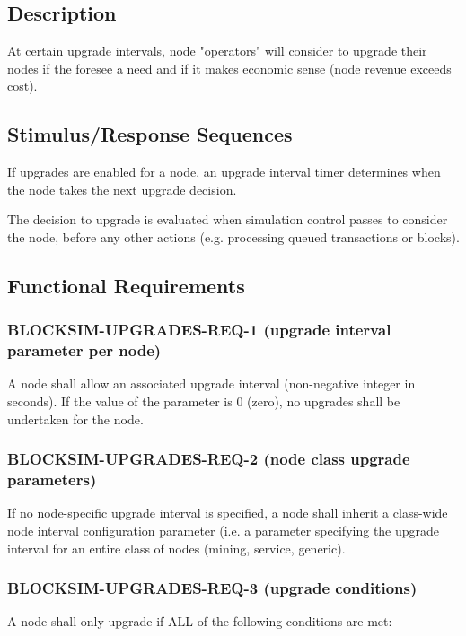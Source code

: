 \documentclass{scrreprt}
\begin{document}
\subsection{Description}

At certain upgrade intervals, node "operators" will consider to upgrade
their nodes if the foresee a need and if it makes economic sense
(node revenue exceeds cost).


\subsection{Stimulus/Response Sequences}

If upgrades are enabled for a node, an upgrade interval timer determines
when the node takes the next upgrade decision.

The decision to upgrade is evaluated when simulation control passes to
consider the node, before any other actions (e.g. processing queued
transactions or blocks).


\subsection{Functional Requirements}

\subsubsection{BLOCKSIM-UPGRADES-REQ-1 (upgrade interval parameter per node)}

A node shall allow an associated upgrade interval (non-negative integer in seconds).
If the value of the parameter is 0 (zero), no upgrades shall be undertaken
for the node.

\subsubsection{BLOCKSIM-UPGRADES-REQ-2 (node class upgrade parameters)}

If no node-specific upgrade interval is specified, a node shall inherit
a class-wide node interval configuration parameter (i.e. a parameter
specifying the upgrade interval for an entire class of nodes (mining,
service, generic).

\subsubsection{BLOCKSIM-UPGRADES-REQ-3 (upgrade conditions)}

A node shall only upgrade if ALL of the following conditions are met:
\end{document}
